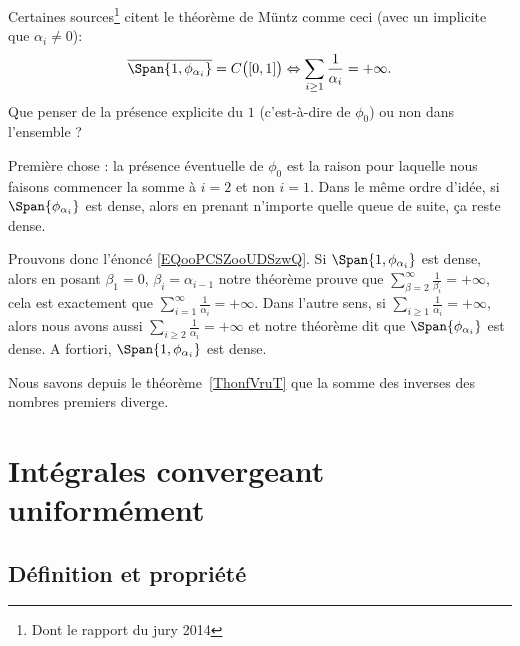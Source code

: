 \begin{remark}      \label{REMooGPYYooCQJwFa}
	Certaines sources\footnote{Dont le rapport du jury 2014} citent le théorème de Müntz comme ceci (avec un implicite que \( \alpha_i\neq 0\)):
	\begin{equation}        \label{EQooPCSZooUDSzwQ}
		\overline{ \Span\{1, \phi_{\alpha_i} \} }=C\big( \mathopen[ 0 , 1 \mathclose] \big) \Leftrightarrow \sum_{i\geq 1}\frac{1}{ \alpha_i }=+\infty.
	\end{equation}
	Que penser de la présence explicite du \( 1\) (c'est-à-dire de \( \phi_0\)) ou non dans l'ensemble ?

	Première chose : la présence éventuelle de \( \phi_0\) est la raison pour laquelle nous faisons commencer la somme à \( i=2\) et non \( i=1\). Dans le même ordre d'idée, si \( \Span\{ \phi_{\alpha_i} \}\) est dense, alors en prenant n'importe quelle queue de suite, ça reste dense.

	Prouvons donc l'énoncé \eqref{EQooPCSZooUDSzwQ}. Si \( \Span\{ 1,\phi_{\alpha_i} \}\) est dense, alors en posant \( \beta_1=0\), \( \beta_i=\alpha_{i-1}\) notre théorème prouve que \( \sum_{\beta=2}^{\infty}\frac{1}{ \beta_i }=+\infty\), cela est exactement que \( \sum_{i=1}^{\infty}\frac{1}{ \alpha_i }=+\infty\). Dans l'autre sens, si \( \sum_{i\geq 1}\frac{1}{ \alpha_i }=+\infty\), alors nous avons aussi \( \sum_{i\geq 2}\frac{1}{ \alpha_i }=+\infty\) et notre théorème dit que \( \Span \{ \phi_{\alpha_i} \}\) est dense. A fortiori, \( \Span\{ 1,\phi_{\alpha_i} \}\) est dense.
\end{remark}

\begin{example}
	Nous savons depuis le théorème~\ref{ThonfVruT} que la somme des inverses des nombres premiers diverge.
\end{example}

\section{Intégrales convergeant uniformément}

\subsection{Définition et propriété}

